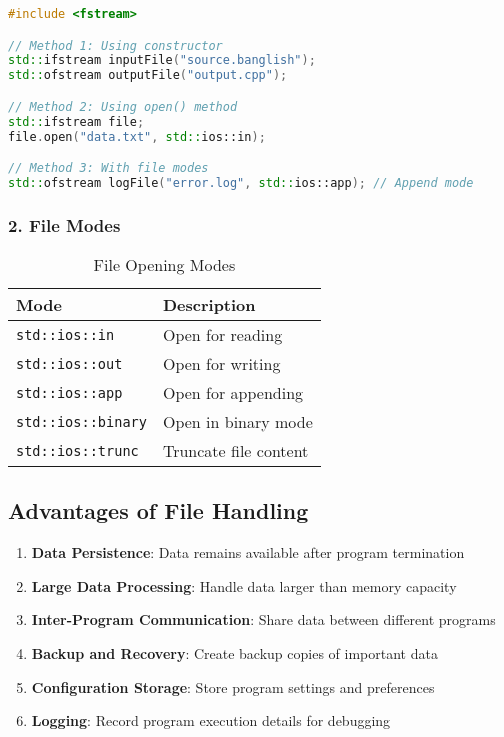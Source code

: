 \documentclass[12pt,a4paper]{article}
\begin{document}
\begin{lstlisting}[language=C++, caption=Opening Files in C++]
#include <fstream>

// Method 1: Using constructor
std::ifstream inputFile("source.banglish");
std::ofstream outputFile("output.cpp");

// Method 2: Using open() method
std::ifstream file;
file.open("data.txt", std::ios::in);

// Method 3: With file modes
std::ofstream logFile("error.log", std::ios::app); // Append mode
\end{lstlisting}

\subsubsection{2. File Modes}

\begin{table}[H]
\centering
\begin{tabular}{|l|l|}
\hline
\textbf{Mode} & \textbf{Description} \\
\hline
\texttt{std::ios::in} & Open for reading \\
\texttt{std::ios::out} & Open for writing \\
\texttt{std::ios::app} & Open for appending \\
\texttt{std::ios::binary} & Open in binary mode \\
\texttt{std::ios::trunc} & Truncate file content \\
\hline
\end{tabular}
\caption{File Opening Modes}
\end{table}

\subsection{Advantages of File Handling}

\begin{enumerate}
    \item \textbf{Data Persistence}: Data remains available after program termination
    \item \textbf{Large Data Processing}: Handle data larger than memory capacity
    \item \textbf{Inter-Program Communication}: Share data between different programs
    \item \textbf{Backup and Recovery}: Create backup copies of important data
    \item \textbf{Configuration Storage}: Store program settings and preferences
    \item \textbf{Logging}: Record program execution details for debugging
\end{enumerate}
\end{document}
